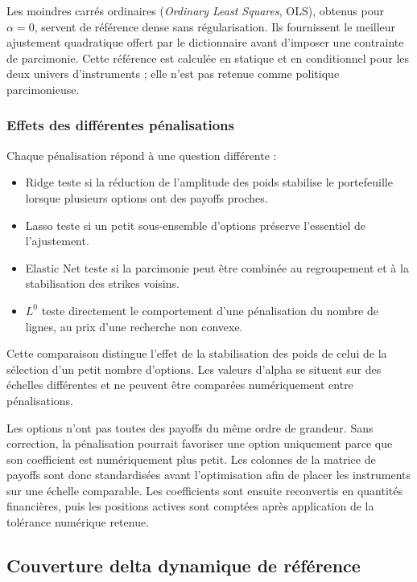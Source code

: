 \documentclass[12pt,a4paper]{article}
\newcommand{\1}{\mathbf{1}}
\begin{document}
Les moindres carrés ordinaires (\emph{Ordinary Least Squares}, OLS), obtenus pour
$\alpha=0$, servent de référence dense sans régularisation. Ils fournissent le
meilleur ajustement quadratique offert par le dictionnaire avant d'imposer une
contrainte de parcimonie. Cette référence est calculée en statique et en conditionnel pour les
deux univers d'instruments ; elle n'est pas retenue comme politique parcimonieuse.

\subsubsection*{Effets des différentes pénalisations}

Chaque pénalisation répond à une question différente :

\begin{itemize}
\item Ridge teste si la réduction de l'amplitude des poids stabilise le portefeuille lorsque plusieurs options ont des payoffs proches.
\item Lasso teste si un petit sous-ensemble d'options préserve l'essentiel de l'ajustement.
\item Elastic Net teste si la parcimonie peut être combinée au regroupement et à la stabilisation des strikes voisins.
\item $L^0$ teste directement le comportement d'une pénalisation du nombre de lignes, au prix d'une recherche non convexe.
\end{itemize}

Cette comparaison distingue l'effet de la stabilisation des poids de celui de
la sélection d'un petit nombre d'options. Les valeurs d'alpha se situent sur des
échelles différentes et ne
peuvent être comparées numériquement entre pénalisations.

Les options n'ont pas toutes des payoffs du même ordre de grandeur. Sans correction,
la pénalisation pourrait favoriser une option uniquement parce que son coefficient
est numériquement plus petit. Les colonnes de la matrice de payoffs sont donc
standardisées avant l'optimisation afin de placer les instruments sur une échelle
comparable. Les coefficients sont ensuite reconvertis en quantités financières,
puis les positions actives sont comptées après application de la tolérance numérique
retenue.

\subsection{Couverture delta dynamique de référence}
\end{document}
